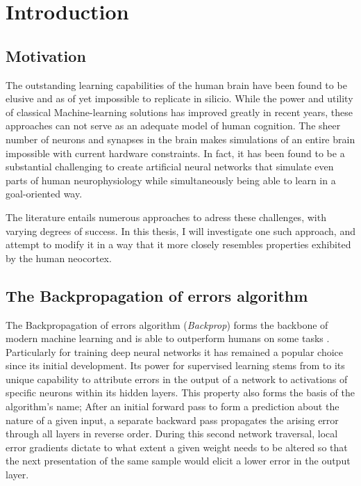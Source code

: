 
\chapter{Introduction}



\section{Motivation}


The outstanding learning capabilities of the human brain have been found to be elusive and as of yet impossible to
replicate in silicio. While the power and utility of classical Machine-learning solutions has improved greatly in recent
years, these approaches can not serve as an adequate model of human cognition. The sheer number of neurons and synapses
in the brain makes simulations of an entire brain impossible with current hardware constraints. In fact, it has been
found to be a substantial challenging to create artificial neural networks that simulate even parts of human
neurophysiology while simultaneously being able to learn in a goal-oriented way.



The literature entails numerous approaches to adress these challenges, with varying degrees of success. In this thesis,
I will investigate one such approach, and attempt to modify it in a way that it more closely resembles properties
exhibited by the human neocortex.




\section{The Backpropagation of errors algorithm}

The Backpropagation of errors algorithm (\textit{Backprop}) forms the backbone of modern machine learning and is able to
outperform humans on some tasks \citeme.  Particularly for training deep neural networks it has remained a popular
choice since its initial development. Its power for supervised learning stems from to its unique capability to attribute
errors in the output of a network to activations of specific neurons within its hidden layers. This property also forms
the basis of the algorithm's name; After an initial forward pass to form a prediction about the nature of a given input,
a separate backward pass propagates the arising error through all layers in reverse order. During this second network
traversal, local error gradients dictate to what extent a given weight needs to be altered so that the next presentation
of the same sample would elicit a lower error in the output layer.


